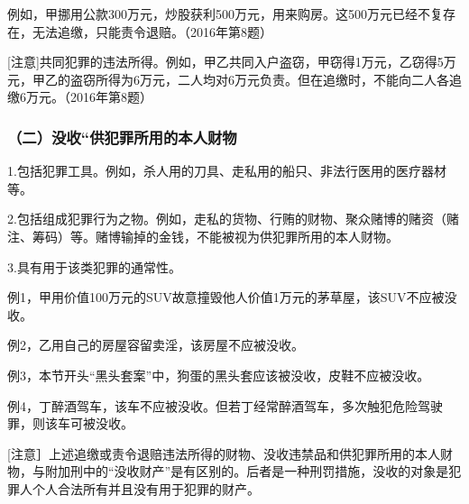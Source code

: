 例如，甲挪用公款300万元，炒股获利500万元，用来购房。这500万元已经不复存在，无法追缴，只能责令退赔。（2016年第8题）

[注意]共同犯罪的违法所得。例如，甲乙共同入户盗窃，甲窃得1万元，乙窃得5万元，甲乙的盗窃所得为6万元，二人均对6万元负责。但在追缴时，不能向二人各追缴6万元。（2016年第8题）

\subsubsection*{（二）没收“供犯罪所用的本人财物}

1.包括犯罪工具。例如，杀人用的刀具、走私用的船只、非法行医用的医疗器材等。

2.包括组成犯罪行为之物。例如，走私的货物、行贿的财物、聚众赌博的赌资（赌注、筹码）等。赌博输掉的金钱，不能被视为供犯罪所用的本人财物。

3.具有用于该类犯罪的通常性。

例1，甲用价值100万元的SUV故意撞毁他人价值1万元的茅草屋，该SUV不应被没收。

例2，乙用自己的房屋容留卖淫，该房屋不应被没收。

例3，本节开头“黑头套案”中，狗蛋的黑头套应该被没收，皮鞋不应被没收。

例4，丁醉酒驾车，该车不应被没收。但若丁经常醉酒驾车，多次触犯危险驾驶罪，则该车可被没收。

[注意］上述追缴或责令退赔违法所得的财物、没收违禁品和供犯罪所用的本人财物，与附加刑中的“没收财产”是有区别的。后者是一种刑罚措施，没收的对象是犯罪人个人合法所有并且没有用于犯罪的财产。
